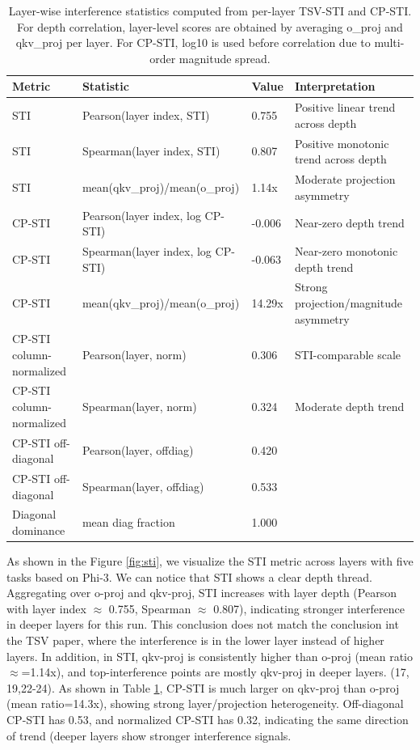 \documentclass[10pt]{article} %
\begin{document}
\begin{table}[t]
\centering
\small
\begin{tabular}{p{4cm} p{4.8cm} p{1.8cm} p{4.4cm}}
\toprule
Metric & Statistic & Value & Interpretation \\ 
\midrule
STI & Pearson(layer index, STI) & 0.755 & Positive linear trend across depth \\ 
STI & Spearman(layer index, STI) & 0.807 & Positive monotonic trend across depth \\ 
STI & mean(qkv\_proj)/mean(o\_proj) & 1.14x & Moderate projection asymmetry \\ 
\midrule
CP-STI & Pearson(layer index, log CP-STI) & -0.006 & Near-zero depth trend \\ 
CP-STI  & Spearman(layer index, log CP-STI) & -0.063 & Near-zero monotonic depth trend \\ 
CP-STI & mean(qkv\_proj)/mean(o\_proj) & 14.29x & Strong projection/magnitude asymmetry \\ 
CP-STI column-normalized & Pearson(layer, norm) & 0.306 & STI-comparable scale \\
CP-STI column-normalized & Spearman(layer, norm) & 0.324 & Moderate depth trend
\\
CP-STI off-diagonal & Pearson(layer, offdiag) & 0.420 \\
CP-STI off-diagonal & Spearman(layer, offdiag) & 0.533 \\
Diagonal dominance & mean diag fraction & 1.000 & \\









\bottomrule
\end{tabular}
\caption{Layer-wise interference statistics computed from per-layer TSV-STI and CP-STI. For depth correlation, layer-level scores are obtained by averaging o\_proj and qkv\_proj per layer. For CP-STI, log10 is used before correlation due to multi-order magnitude spread.}
\label{tab:interference_rebuttal}
\end{table}

As shown in the Figure \ref{fig:sti}, we visualize the STI metric across layers with five tasks based on Phi-3. We can notice that STI shows a clear depth thread. Aggregating over o-proj and qkv-proj, STI increases with layer depth (Pearson with layer index $\approx$ 0.755, Spearman $\approx$ 0.807), indicating stronger interference in deeper layers for this run. This conclusion does not match the conclusion int the TSV paper, where the interference is in the lower layer instead of higher layers. In addition, in STI, qkv-proj is consistently higher than o-proj (mean ratio $\approx$=1.14x), and top-interference points are mostly qkv-proj in deeper layers. (17, 19,22-24). As shown in Table \ref{tab:interference_rebuttal}, CP-STI is much larger on qkv-proj than o-proj (mean ratio=14.3x), showing strong layer/projection heterogeneity. Off-diagonal CP-STI has 0.53, and normalized CP-STI has 0.32, indicating the same direction of trend (deeper layers show stronger interference signals.
\end{document}
